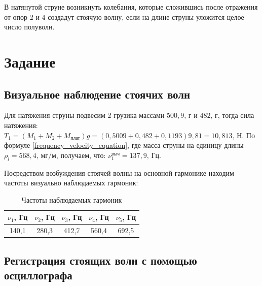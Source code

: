 \documentclass[a4paper,12pt]{article}
\begin{document}
	В натянутой струне возникнуть колебания, которые сложившись после отражения от опор 2 и 4 создадут стоячую волну, если на длине струны уложится целое число полуволн.
	
	\section{Задание}
	\subsection{Визуальное наблюдение стоячих волн}
	
	Для натяжения струны подвесим 2 грузика массами $500,9 \text{, г}$ и $482\text{, г}$, тогда сила натяжения: $T_1 = (M_1 + M_2 + M_\text{плат})g = (0,5009 + 0,482 + 0,1193)9,81  = 10,813 \text{, Н}$. По формуле \eqref{frequency_velocity_equation}, где масса струны на единицу длины $\rho_l = 568,4\text{, мг}/\text{м}$, получаем, что: $\nu_1^{\text{выч}} = 137,9\text{, Гц}$.
	
	Посредством возбуждения стоячей волны на основной гармонике находим частоты визуально наблюдаемых гармоник:
	\begin{table}[!h]
		\begin{center}
			\begin{tabular}{|c|c|c|c|c|}
				\hline
				$\nu_1$, Гц &$\nu_2$, Гц& $\nu_3$, Гц& $\nu_4$, Гц& $\nu_5$, Гц\\
				\hline
				140,1 & 280,3 & 412,7 & 560,4& 692,5\\
				\hline 
			\end{tabular}
		\caption{Частоты наблюдаемых гармоник}
		\end{center}
	\end{table}

	\subsection{Регистрация стоящих волн с помощью осциллографа}
	
\end{document}
